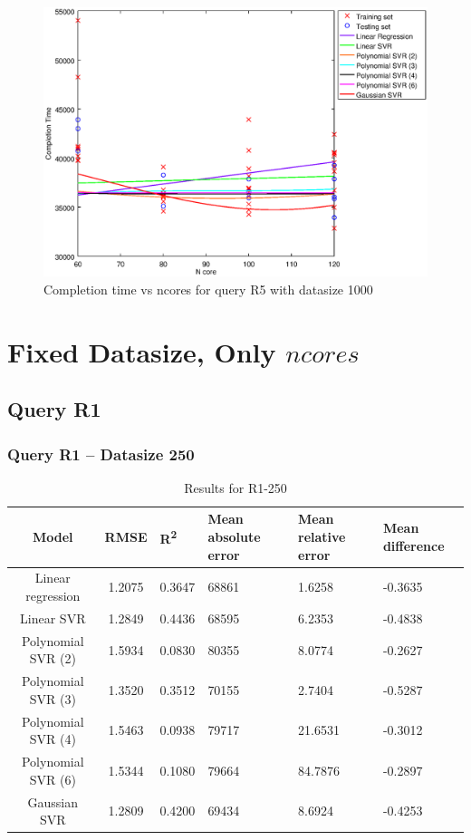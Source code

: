 \documentclass[a4paper,11pt]{article}
\begin{document}
\begin {figure}[hbtp]
\centering
\includegraphics[width=\textwidth]{output/R5_1000_LINEAR_NCORE/plot_R5_1000.eps}
\caption{Completion time vs ncores for query R5 with datasize 1000}
\label{fig:all_linear_R5_1000}
\end {figure}


\newpage
\section{Fixed Datasize, Only $ncores$}
\subsection{Query R1}
\subsubsection{Query R1 -- Datasize 250}
\begin{table}[H]
	\centering
	\begin{adjustbox}{center}
		\begin{tabular}{c | c M{1.2cm} M{2.5cm} M{2.5cm} M{1.8cm}}
			Model & RMSE & R\textsuperscript{2} & Mean absolute error & Mean relative error & Mean difference \tabularnewline
			\hline
			Linear regression & 1.2075 & 0.3647 &  68861 & 1.6258 & -0.3635 \\
			Linear SVR & 1.2849 & 0.4436 &  68595 & 6.2353 & -0.4838 \\
			Polynomial SVR (2) & 1.5934 & 0.0830 &  80355 & 8.0774 & -0.2627 \\
			Polynomial SVR (3) & 1.3520 & 0.3512 &  70155 & 2.7404 & -0.5287 \\
			Polynomial SVR (4) & 1.5463 & 0.0938 &  79717 & 21.6531 & -0.3012 \\
			Polynomial SVR (6) & 1.5344 & 0.1080 &  79664 & 84.7876 & -0.2897 \\
			Gaussian SVR & 1.2809 & 0.4200 &  69434 & 8.6924 & -0.4253 \\
		\end{tabular}
	\end{adjustbox}
	\\
	\caption{Results for R1-250}
	\label{fig:coreonly_linear_R1_250}
\end{table}
\end{document}
